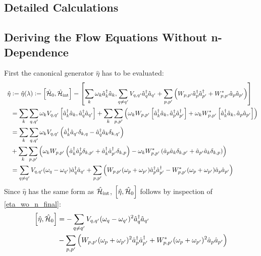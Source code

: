 \begin{appendix}

\chapter{Detailed Calculations}\label{Detailed Calculations}
\thispagestyle{empty}

\section{Deriving the Flow Equations Without n-Dependence}\label{Deriving the Flow Equations in the Case of No n-Dependence}
First the canonical generator $\hat\eta$ has to be evaluated:
\begin{align}
\hat\eta&\vcentcolon=\hat\eta(\lambda)\vcentcolon=\left[\hat{\mathcal{H}}_0,\hat{\mathcal{H}}_{\mathrm{int}}\right] = \left[\sum\limits_k \omega_k \hat a^\dagger_k\hat a_k,\sum\limits_{q\neq q^\prime}V_{q,q^\prime}\hat a^\dagger_q\hat a_{q^\prime}+\sum\limits_{p,p^\prime}\left(W_{p,p^\prime}\hat a^\dagger_p\hat a^\dagger_{p^\prime}+W_{p,p^\prime}^*\hat a_p\hat a_{p^\prime}\right)\right]  \\ \quad& 
= \sum\limits_k\sum\limits_{q,q^\prime}\omega_kV_{q,q^\prime}\left[\hat a^\dagger_k\hat a_k,\hat a^\dagger_q\hat a_{q^\prime}\right]+\sum\limits_k\sum\limits_{p,p^\prime}\left(\omega_k W_{p,p^\prime}\left[\hat a^\dagger_k\hat a_k,\hat a^\dagger_p\hat a^\dagger_{p^\prime}\right]+\omega_k W_{p,p^\prime}^*\left[\hat a^\dagger_k\hat a_k,\hat a_p\hat a_{p^\prime}\right]\right) \nonumber \\ \quad& 
=\sum\limits_k\sum\limits_{q,q^\prime}\omega_kV_{q,q^\prime}\left(\hat a^\dagger_k\hat a_{q^\prime}\delta_{k,q}-\hat a^\dagger_q\hat a_k\delta_{k,q^\prime}\right) \nonumber \\ \quad& +\sum\limits_k\sum\limits_{p,p^\prime}\left(\omega_k W_{p,p^\prime}\left(\hat a^\dagger_k\hat a^\dagger_p\delta_{k,p^\prime}+\hat a^\dagger_k\hat a^\dagger_{p^\prime}\delta_{k,p}\right)-\omega_k W_{p,p^\prime}^*\left(\hat a_p\hat a_k\delta_{k,p^\prime}+\hat a_{p^\prime}\hat a_k\delta_{k,p}\right)\right) \nonumber \\ \quad& = \sum\limits_{q\neq q^\prime}V_{q,q^\prime}(\omega_q-\omega_{q^\prime})\hat a^\dagger_q\hat a_{q^\prime}+\sum\limits_{p,p^\prime}\left(W_{p,p^\prime}(\omega_p+\omega_{p^\prime})\hat a^\dagger_p\hat a^\dagger_{p^\prime}-W_{p,p^\prime}^*(\omega_p+\omega_{p^\prime})\hat a_p\hat a_{p^\prime}\right) \label{eta_wo_n_final}
\end{align}
Since $\hat\eta$ has the same form as $\hat{\mathcal{H}}_{\mathrm{int}}$, $\left[\hat\eta,\hat{\mathcal{H}}_0\right]$ follows by inspection of \ref{eta_wo_n_final}:
\begin{align}
\left[\hat\eta,\ham_0\right]&=-\Sum_{q\neq q^\prime}V_{q,q^\prime}(\omega_q-\omega_{q^\prime})^2\CR_q\AN_{q^\prime}\nonumber \\ \quad& -\Sum_{p,p^\prime}\left(W_{p,p^\prime}(\omega_p+\omega_{p^\prime})^2\CR_p\CR_{p^\prime}+W_{p,p^\prime}^*(\omega_p+\omega_{p^\prime})^2\AN_p\AN_{p^\prime}\right) 

\end{align}
\end{appendix}
